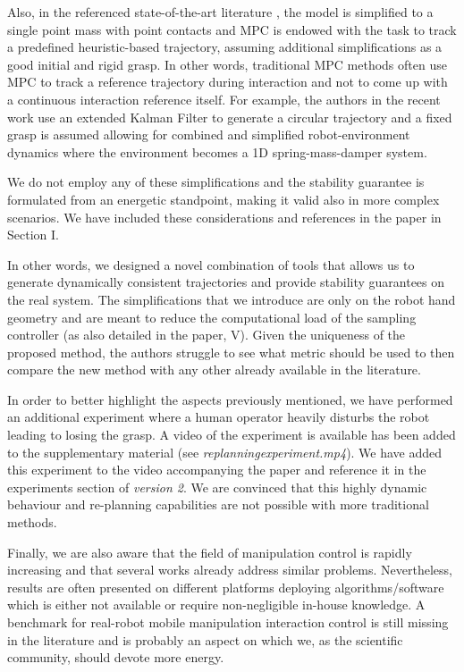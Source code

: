 \documentclass[10pt]{article}
\newcommand{\version}[1]{\textit{version #1}}
\begin{document}
\begin{enumerate}[label={[E:\,\arabic{enumi}]}]
Also, in the referenced state-of-the-art literature \cite{minniti2021model}, the model is simplified to a single point mass with point contacts and MPC is endowed with the task to track a predefined heuristic-based trajectory, assuming additional simplifications as a good initial and rigid grasp. In other words, traditional MPC methods often use MPC to track a reference trajectory during interaction and not to come up with a continuous interaction reference itself. 
For example, the authors in the recent work \cite{minniti2021model} use an extended Kalman Filter to generate a circular trajectory and a fixed grasp is assumed allowing for combined and simplified robot-environment dynamics  where the environment becomes a 1D spring-mass-damper system. 

We do not employ any of these simplifications and the stability guarantee is formulated from an energetic standpoint, making it valid also in more complex scenarios. We have included these considerations and references in the paper in Section I.

In other words, we designed a novel combination of tools that allows us to generate dynamically consistent trajectories and provide stability guarantees on the real system. The simplifications that we introduce are only on the robot hand geometry and are meant to reduce the computational load of the sampling controller (as also detailed in the paper, \sect V). Given the uniqueness of the proposed method, the authors struggle to see what metric should be used to then compare the new method with any other already available in the literature. 

In order to better highlight the aspects previously mentioned, we have performed an additional experiment where a human operator heavily disturbs the robot leading to losing the grasp. A video of the experiment is available has been added to the supplementary material (see \emph{replanning\textunderscore experiment.mp4}). We have added this experiment to the video accompanying the paper and reference it in the experiments section of \version{2}. We are convinced that this highly dynamic behaviour and re-planning capabilities are not possible with more traditional methods.

Finally, we are also aware that the field of manipulation control is rapidly increasing and that several works already address similar problems. Nevertheless, results are often presented on different platforms deploying algorithms/software which is either not available or require non-negligible in-house knowledge. A benchmark for real-robot mobile manipulation interaction control is still missing in the literature and is probably an aspect on which we, as the scientific community, should devote more energy.



\end{enumerate}
\end{document}
